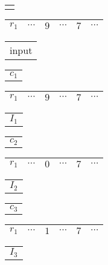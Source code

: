 \documentclass[12pt]{article}
\begin{document}
\begin{center}
\begin{tabular}{ p{0.5cm} }
\hspace{1 pt}
\end{tabular}
\begin{tabular}{|c|c|c|c|c|c}
\hline
$r_1$ & $\cdots$ & $9$ & $\cdots$ & $7$ & $\cdots$ \\
\hline
\end{tabular}
\begin{tabular}{ p{0.5cm} }
input
\end{tabular}
\end{center}
\vspace{-0.75cm}
\begin{center}
\begin{tabular}{ p{0.5cm} }
$c_1$
\end{tabular}
\begin{tabular}{|c|c|c|c|c|c}
\hline
$r_1$ & $\cdots$ & $9$ & $\cdots$ & $7$ & $\cdots$ \\
\hline
\end{tabular}
\begin{tabular}{ p{0.5cm} }
$I_1$
\end{tabular}
\end{center}
\vspace{-0.75cm}
\begin{center}
\begin{tabular}{ p{0.5cm} }
$c_2$
\end{tabular}
\begin{tabular}{|c|c|c|c|c|c}
\hline
$r_1$ & $\cdots$ & $0$ & $\cdots$ & $7$ & $\cdots$ \\
\hline
\end{tabular}
\begin{tabular}{ p{0.5cm} }
$I_2$
\end{tabular}
\end{center}
\vspace{-0.75cm}
\begin{center}
\begin{tabular}{ p{0.5cm} }
$c_3$
\end{tabular}
\begin{tabular}{|c|c|c|c|c|c}
\hline
$r_1$ & $\cdots$ & $1$ & $\cdots$ & $7$ & $\cdots$ \\
\hline
\end{tabular}
\begin{tabular}{ p{0.5cm} }
$I_3$
\end{tabular}
\end{center}
\end{document}
